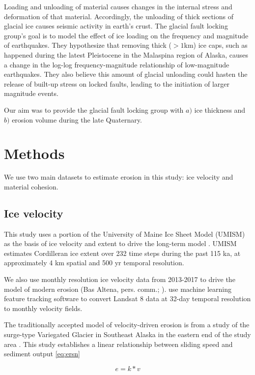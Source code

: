 \documentclass[twocolumn]{aastex6}
\begin{document}
		Loading and unloading of material causes changes in the internal stress and deformation of that material. Accordingly, the unloading of thick sections of glacial ice causes seismic activity in earth's crust. The glacial fault locking group's goal is to model the effect of ice loading on the frequency and magnitude of earthquakes. They hypothesize that removing thick ($>1$km) ice caps, such as happened during the latest Pleistocene in the Malaspina region of Alaska, causes a change in the log-log frequency-magnitude relationship of low-magnitude earthquakes. They also believe this amount of glacial unloading could hasten the release of built-up stress on locked faults, leading to the initiation of larger magnitude events.

		Our aim was to provide the glacial fault locking group with $a)$ ice thickness and $b)$ erosion volume during the late Quaternary.


	\section{Methods}
		We use two main datasets to estimate erosion in this study: ice velocity and material cohesion.
		
	\subsection{Ice velocity}
		This study uses a portion of the University of Maine Ice Sheet Model (UMISM) as the basis of ice velocity and extent to drive the long-term model \citep{Fastook1989,Johnson2002,Kleman2002,Hooke2007}. UMISM estimates Cordilleran ice extent over 232 time steps during the past 115 ka, at approximately 4 km spatial and 500 yr temporal resolution.
		
		We also use monthly resolution ice velocity data from 2013-2017 to drive the model of modern erosion (Bas Altena, pers. comm.; \citealt{Altena2018}). \citet{Altena2018} use machine learning feature tracking software to convert Landsat 8 data at 32-day temporal resolution to monthly velocity fields.

		The traditionally accepted model of velocity-driven erosion is from a study of the surge-type Variegated Glacier in Southeast Alaska in the eastern end of the study area \citep{Humphrey1994}. This study establishes a linear relationship between sliding speed and sediment output \eqref{eq:ersn}
		
		\begin{equation} \label{eq:ersn}
			e = k * v
		\end{equation}
		
\end{document}
